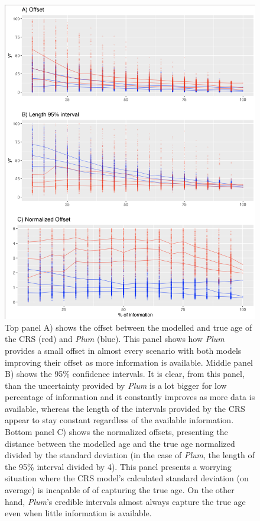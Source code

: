 \documentclass [10pt] {article}
\begin{document}
\begin{figure}[!]
 \centering
  \includegraphics[width=.75\linewidth]{AccPrec.png}
	\caption{Top panel A) shows the offset between the modelled and true age of the CRS (red) and \textit{Plum} (blue). This panel shows how \textit{Plum} provides a small offset in almost every scenario with both models improving their offset as more information is available. Middle panel B) shows the 95\% confidence intervals. It is clear, from this panel, than the uncertainty provided by \textit{Plum} is a lot bigger for low percentage of information and it constantly improves as more data is available, whereas the length of the intervals provided by the CRS appear to stay constant regardless of the available information. Bottom panel C) shows the normalized offsets, presenting the distance between the modelled age and the true age normalized divided by the standard deviation (in the case of \textit{Plum}, the length of the 95\% interval divided by 4). This panel presents a worrying situation where the CRS model's calculated standard deviation (on average) is incapable of of capturing the true age. On the other hand, \textit{Plum}'s credible intervals almost always capture the true age even when little information is available.}
  \label{fig:accpre}
\end{figure}
\end{document}
